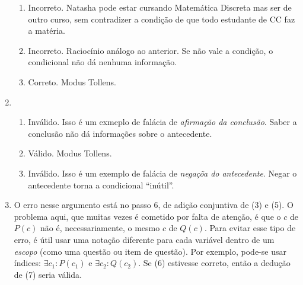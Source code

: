 \documentclass[leqno]{article} %
\begin{document}
\begin{enumerate}
\begin{enumerate}
            \item Incorreto. Natasha pode estar cursando Matemática Discreta mas ser de outro curso, sem contradizer a condição de que todo estudante de CC faz a matéria.

            \item Incorreto. Raciocínio análogo ao anterior. Se não vale a condição, o condicional não dá nenhuma informação.

            \item Correto. Modus Tollens.

        \end{enumerate}

    \item 

        \begin{enumerate}

            \item Inválido. Isso é um exmeplo de falácia de \textit{afirmação da conclusão}. Saber a conclusão não dá informações sobre o antecedente.

            \item Válido. Modus Tollens.

            \item Inválido. Isso é um exemplo de falácia de \textit{negaçõa do antecedente}. Negar o antecedente torna a condicional ``inútil''.

        \end{enumerate}

    \item O erro nesse argumento está no passo 6, de adição conjuntiva de (3) e (5). O problema aqui, que muitas vezes é cometido por falta de atenção, é que o \( c \) de \( P(c) \) não é, necessariamente, o mesmo \( c \) de \( Q(c) \). Para evitar esse tipo de erro, é útil usar uma notação diferente para cada variável dentro de um \textit{escopo} (como uma questão ou item de questão). Por exemplo, pode-se usar índices: \( \exists c_1 : P(c_1) \) e \( \exists c_2 : Q(c_2) \). Se (6) estivesse correto, então a dedução de (7) seria válida.

\end{enumerate}
\end{document}
